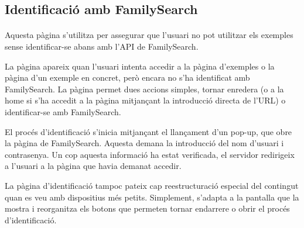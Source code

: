 \subsection{Identificació amb FamilySearch}

    \paragraph{}
    Aquesta pàgina s'utilitza per assegurar que l'usuari no pot utilitzar els exemples sense identificar-se abans amb l’API de FamilySearch.

    La pàgina apareix quan l'usuari intenta accedir a la pàgina d'exemples o la pàgina d'un exemple en concret, però encara no s’ha identificat amb FamilySearch. La pàgina permet dues accions simples, tornar enredera (o a la home si s'ha accedit a la pàgina mitjançant la introducció directa de l'URL) o identificar-se amb FamilySearch.

    El procés d'identificació s'inicia mitjançant el llançament d'un pop-up, que obre la pàgina de FamilySearch. Aquesta demana la introducció del nom d'usuari i contrasenya. Un cop aquesta informació ha estat verificada, el servidor redirigeix a l'usuari a la pàgina que havia demanat accedir.

    La pàgina d'identificació tampoc pateix cap reestructuració especial del contingut quan es veu amb dispositius més petits. Simplement, s'adapta a la pantalla que la mostra i reorganitza els botons que permeten tornar endarrere o obrir el procés d’identificació.
